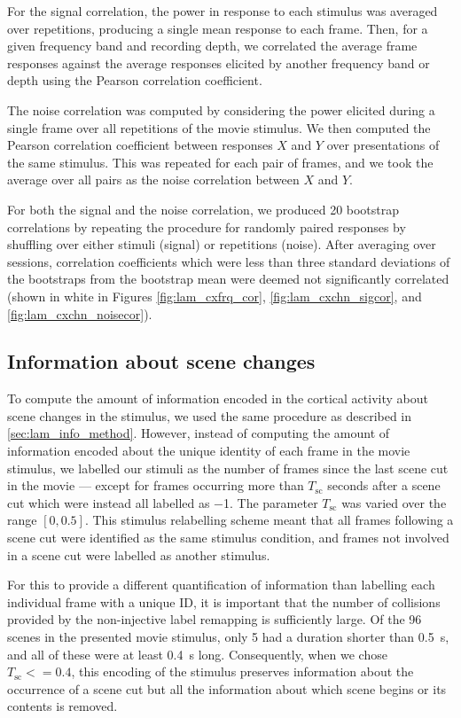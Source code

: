 For the signal correlation, the power in response to each stimulus was averaged over repetitions, producing a single mean response to each frame.
Then, for a given frequency band and recording depth, we correlated the average frame responses against the average responses elicited by another frequency band or depth using the Pearson correlation coefficient.

The noise correlation was computed by considering the power elicited during a single frame over all repetitions of the movie stimulus.
We then computed the Pearson correlation coefficient between responses $X$ and $Y$ over presentations of the same stimulus.
This was repeated for each pair of frames, and we took the average over all pairs as the noise correlation between $X$ and $Y$.

For both the signal and the noise correlation, we produced \num{20} bootstrap correlations by repeating the procedure for randomly paired responses by shuffling over either stimuli (signal) or repetitions (noise).
After averaging over sessions, correlation coefficients which were less than three standard deviations of the bootstraps from the bootstrap mean were deemed not significantly correlated (shown in white in Figures \ref{fig:lam_cxfrq_cor}, \ref{fig:lam_cxchn_sigcor}, and \ref{fig:lam_cxchn_noisecor}).


\subsection{Information about scene changes}
\label{sec:lam_scnchg_method}

To compute the amount of information encoded in the cortical activity about scene changes in the stimulus, we used the same procedure as described in \autoref{sec:lam_info_method}.
However, instead of computing the amount of information encoded about the unique identity of each frame in the movie stimulus, we labelled our stimuli as the number of frames since the last scene cut in the movie --- except for frames occurring more than $T_\text{sc}$ seconds after a scene cut which were instead all labelled as \num{-1}.
The parameter $T_\text{sc}$ was varied over the range $[0, 0.5]$.
This stimulus relabelling scheme meant that all frames following a scene cut were identified as the same stimulus condition, and frames not involved in a scene cut were labelled as another stimulus.

For this to provide a different quantification of information than labelling each individual frame with a unique ID, it is important that the number of collisions provided by the non-injective label remapping is sufficiently large.
Of the \num{96} scenes in the presented movie stimulus, only \num{5} had a duration shorter than \SI{0.5}{\second}, and all of these were at least \SI{0.4}{\second} long.
Consequently, when we chose $T_\text{sc} <= 0.4$, this encoding of the stimulus preserves information about the occurrence of a scene cut but all the information about which scene begins or its contents is removed.

